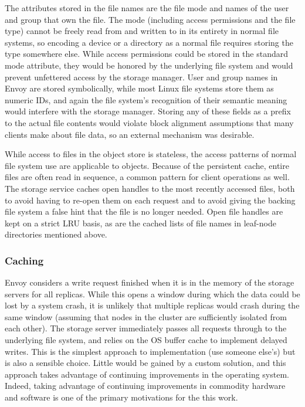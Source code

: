 The attributes stored in the file names are the file mode and names of the user and group that own the file. The mode (including access permissions and the file type) cannot be freely read from and written to in its entirety in normal file systems, so encoding a device or a directory as a normal file requires storing the type somewhere else. While access permissions could be stored in the standard mode attribute, they would be honored by the underlying file system and would prevent unfettered access by the storage manager. User and group names in Envoy are stored symbolically, while most Linux file systems store them as numeric IDs, and again the file system's recognition of their semantic meaning would interfere with the storage manager. Storing any of these fields as a prefix to the actual file contents would violate block alignment assumptions that many clients make about file data, so an external mechanism was desirable.

While access to files in the object store is stateless, the access patterns of normal file system use are applicable to objects. Because of the persistent cache, entire files are often read in sequence, a common pattern for client operations as well. The storage service caches open handles to the most recently accessed files, both to avoid having to re-open them on each request and to avoid giving the backing file system a false hint that the file is no longer needed. Open file handles are kept on a strict LRU basis, as are the cached lists of file names in leaf-node directories mentioned above.

\subsubsection{Caching}

Envoy considers a write request finished when it is in the memory of the storage servers for all replicas. While this opens a window during which the data could be lost by a system crash, it is unlikely that multiple replicas would crash during the same window (assuming that nodes in the cluster are sufficiently isolated from each other). The storage server immediately passes all requests through to the underlying file system, and relies on the OS buffer cache to implement delayed writes. This is the simplest approach to implementation (use someone else's) but is also a sensible choice. Little would be gained by a custom solution, and this approach takes advantage of continuing improvements in the operating system. Indeed, taking advantage of continuing improvements in commodity hardware and software is one of the primary motivations for the this work.

